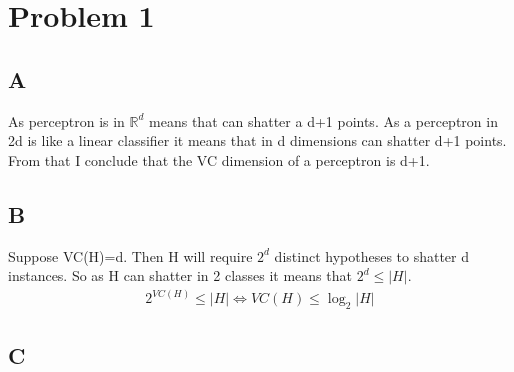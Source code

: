 \section{Problem 1}
\subsection{A}
As perceptron is in $\mathbb{R}^d$ means that can shatter a d+1
points. As a perceptron in 2d is like a linear classifier it means
that in d dimensions can shatter d+1 points. From that I conclude that 
the VC dimension of a perceptron is d+1.
\subsection{B}
Suppose VC(H)=d. Then H will require $2^d$ distinct hypotheses to shatter d instances.
So as H can shatter in 2 classes it means that $2^d \leq \lvert H\rvert$.
\begin{eqnarray}
2^{VC(H)} \leq \lvert H\rvert \Leftrightarrow
VC(H) \leq \log_2 \lvert H\rvert
\end{eqnarray}
\subsection{C}
